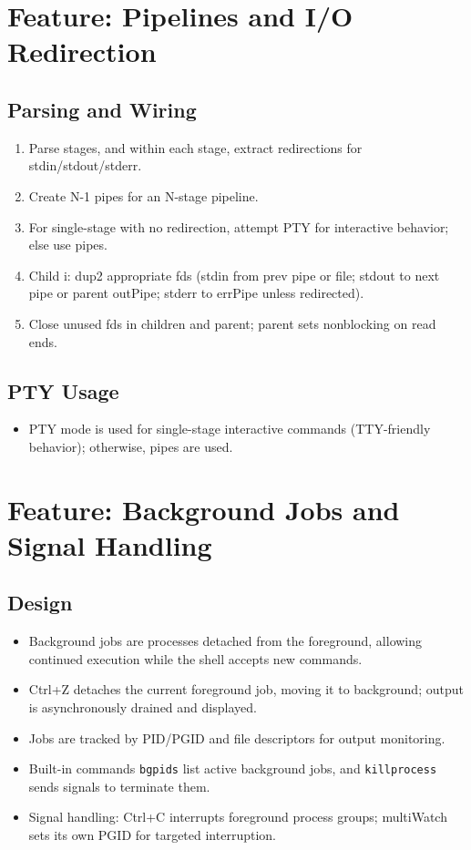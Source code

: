 \documentclass[11pt,a4paper]{article}
\begin{document}
\section{Feature: Pipelines and I/O Redirection}

\subsection{Parsing and Wiring}
\begin{enumerate}[leftmargin=*]
  \item Parse stages, and within each stage, extract redirections for stdin/stdout/stderr.
  \item Create N-1 pipes for an N-stage pipeline.
  \item For single-stage with no redirection, attempt PTY for interactive behavior; else use pipes.
  \item Child i: dup2 appropriate fds (stdin from prev pipe or file; stdout to next pipe or parent outPipe; stderr to errPipe unless redirected).
  \item Close unused fds in children and parent; parent sets nonblocking on read ends.
\end{enumerate}

\subsection{PTY Usage}
\begin{itemize}[leftmargin=*]
  \item PTY mode is used for single-stage interactive commands (TTY-friendly behavior); otherwise, pipes are used.
\end{itemize}

\section{Feature: Background Jobs and Signal Handling}

\subsection{Design}
\begin{itemize}[leftmargin=*]
  \item Background jobs are processes detached from the foreground, allowing continued execution while the shell accepts new commands.
  \item Ctrl+Z detaches the current foreground job, moving it to background; output is asynchronously drained and displayed.
  \item Jobs are tracked by PID/PGID and file descriptors for output monitoring.
  \item Built-in commands \texttt{bgpids} list active background jobs, and \texttt{killprocess} sends signals to terminate them.
  \item Signal handling: Ctrl+C interrupts foreground process groups; multiWatch sets its own PGID for targeted interruption.
\end{itemize}
\end{document}
